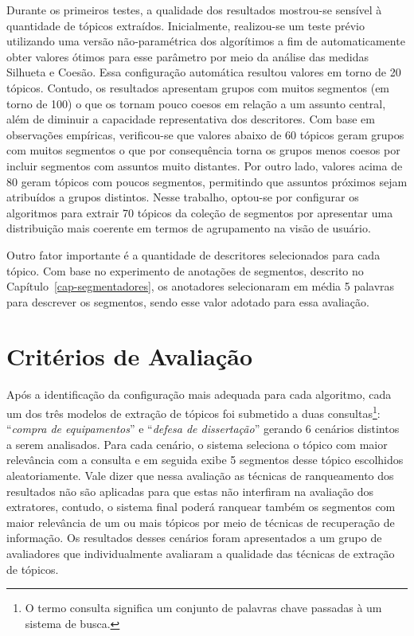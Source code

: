 Durante os primeiros testes, a qualidade dos resultados mostrou-se sensível à quantidade de tópicos extraídos.
Inicialmente, realizou-se um teste prévio utilizando uma versão não-paramétrica dos algorítimos a fim de automaticamente obter valores ótimos para esse parâmetro por meio da análise das medidas Silhueta e Coesão. Essa configuração automática resultou valores em torno de 20 tópicos. Contudo, os resultados apresentam grupos com muitos segmentos (em torno de 100) o que os tornam pouco coesos em relação a um assunto central, além de diminuir a capacidade representativa dos descritores.
Com base em observações empíricas, verificou-se que valores abaixo de 60 tópicos geram grupos com muitos segmentos o que por consequência torna os grupos menos coesos por incluir segmentos com assuntos muito distantes. Por outro lado, valores acima de 80 geram tópicos com poucos segmentos, permitindo que assuntos próximos sejam atribuídos a grupos distintos. Nesse trabalho, optou-se por configurar os algoritmos para extrair 70 tópicos da coleção de segmentos por apresentar uma distribuição mais coerente em termos de agrupamento na visão de usuário.

Outro fator importante é a quantidade de descritores selecionados para cada tópico. Com base no experimento de anotações de segmentos, descrito no Capítulo~\ref{cap-segmentadores}, os anotadores selecionaram em média 5 palavras para descrever os segmentos, sendo esse valor adotado para essa avaliação.




\section{Critérios de Avaliação}

Após a identificação da configuração mais adequada para cada algoritmo, cada um dos três modelos de extração de tópicos foi submetido a duas consultas\footnote{O termo consulta significa um conjunto de palavras chave passadas à um sistema de busca.}: ``\textit{compra de equipamentos}'' e ``\textit{defesa de dissertação}'' gerando 6 cenários distintos a serem analisados. 
Para cada cenário, o sistema seleciona o tópico com maior relevância com a consulta e em seguida exibe 5 segmentos desse tópico escolhidos aleatoriamente. 
Vale dizer que nessa avaliação as técnicas de ranqueamento dos resultados não são aplicadas para que estas não interfiram na avaliação dos extratores, contudo, o sistema final poderá ranquear também os segmentos com maior relevância de um ou mais tópicos por meio de técnicas de recuperação de informação. 
Os resultados desses cenários foram apresentados a um grupo de avaliadores que individualmente avaliaram a qualidade das técnicas de extração de tópicos. 
%

